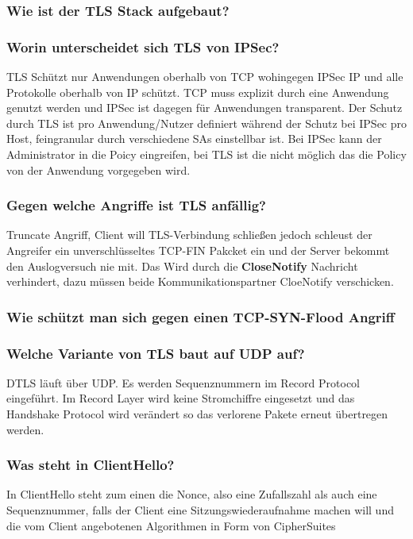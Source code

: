 	
	\subsubsection{Wie ist der TLS Stack aufgebaut?}

	
	\subsubsection{Worin unterscheidet sich TLS von IPSec?}
	TLS Schützt nur Anwendungen oberhalb von TCP wohingegen IPSec IP und alle Protokolle oberhalb von IP schützt. TCP muss explizit durch eine Anwendung genutzt werden und IPSec ist dagegen für Anwendungen transparent.
	Der Schutz durch TLS ist pro Anwendung/Nutzer definiert während der Schutz bei IPSec pro Host, feingranular durch verschiedene SAs einstellbar ist. Bei IPSec kann der Administrator in die Poicy eingreifen, bei TLS ist die nicht möglich das die Policy von der Anwendung vorgegeben wird.

	\subsubsection{Gegen welche Angriffe ist TLS anfällig?}
	Truncate Angriff, Client will TLS-Verbindung schließen jedoch schleust der Angreifer ein unverschlüsseltes TCP-FIN Pakcket ein und der Server bekommt den Auslogversuch nie mit.\newline
	Das Wird durch die \textbf{CloseNotify} Nachricht verhindert, dazu müssen beide Kommunikationspartner CloeNotify verschicken.
	\subsubsection{Wie schützt man sich gegen einen TCP-SYN-Flood Angriff}
	
	\subsubsection{Welche Variante von TLS baut auf UDP auf?}
	DTLS läuft über UDP. Es werden Sequenznummern im Record Protocol eingeführt. Im Record Layer wird keine Stromchiffre eingesetzt und das Handshake Protocol wird verändert so das verlorene Pakete erneut übertregen werden.
		
	\subsubsection{Was steht in ClientHello?}
	In ClientHello steht zum einen die Nonce, also eine Zufallszahl als auch eine Sequenznummer, falls der Client eine Sitzungswiederaufnahme machen will und die vom Client angebotenen Algorithmen in Form von CipherSuites

